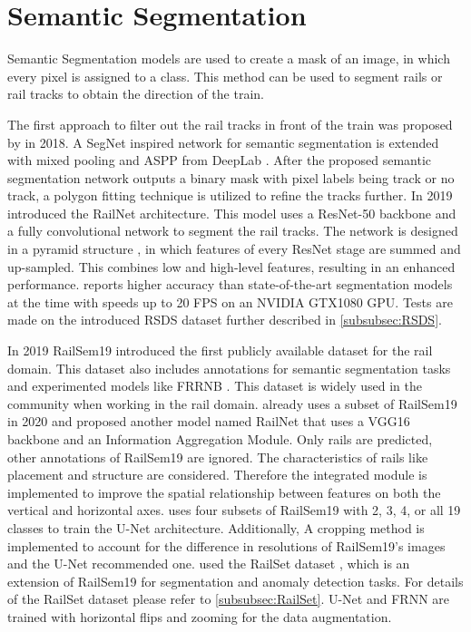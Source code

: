 \section{Semantic Segmentation}
\label{sec:SemanticSegmentation}

Semantic Segmentation models are used to create a mask of an image, in which every pixel is assigned to a class.
This method can be used to segment rails or rail tracks to obtain the direction of the train.

The first approach to filter out the rail tracks in front of the train was proposed by \cite{firstRailSegmentation2018} in 2018.
A SegNet \cite{SegNet2017} inspired network for semantic segmentation is extended with mixed pooling \cite{mixedPooling2014} and \ac{ASPP} from DeepLab \cite{deepLab2018}.
After the proposed semantic segmentation network outputs a binary mask with pixel labels being track or no track, a polygon fitting technique is utilized to refine the tracks further.
In 2019 \cite{railNet2019} introduced the RailNet architecture.
This model uses a ResNet-50 \cite{ResNet} backbone and a fully convolutional network \cite{FullyConvolutionalNetworks2015} to segment the rail tracks.
The network is designed in a pyramid structure \cite{FPN2017_two_stage-detector}, in which features of every ResNet stage are summed and up-sampled.
This combines low and high-level features, resulting in an enhanced performance.
\cite{railNet2019} reports higher accuracy than state-of-the-art segmentation models at the time with speeds up to 20 \ac{FPS} on an NVIDIA GTX1080 GPU.
Tests are made on the introduced \ac{RSDS} dataset further described in \autoref{subsubsec:RSDS}.

In 2019 RailSem19 \cite{railsem19dataset} introduced the first publicly available dataset for the rail domain.
This dataset also includes annotations for semantic segmentation tasks and experimented models like FRRNB \cite{FRRNBModel2017}.
This dataset is widely used in the community when working in the rail domain.
\cite{RailNet2020} already uses a subset of RailSem19 in 2020 and proposed another model named RailNet that uses a VGG16 \cite{VGGNet2015} backbone and an Information Aggregation Module.
Only rails are predicted, other annotations of RailSem19 are ignored.
The characteristics of rails like placement and structure are considered.
Therefore the integrated module is implemented to improve the spatial relationship between features on both the vertical and horizontal axes.
\cite{automatedSemSeg2022} uses four subsets of RailSem19 with 2, 3, 4, or all 19 classes to train the U-Net \cite{uNet2015} architecture.
Additionally, A cropping method is implemented to account for the difference in resolutions of RailSem19's images and the U-Net recommended one.
\cite{hadded2022application} used the RailSet dataset \cite{railSet2022}, which is an extension of RailSem19 for segmentation and anomaly detection tasks.
For details of the RailSet dataset please refer to \autoref{subsubsec:RailSet}.
U-Net \cite{uNet2015} and FRNN \cite{FRRNBModel2017} are trained with horizontal flips and zooming for the data augmentation.

